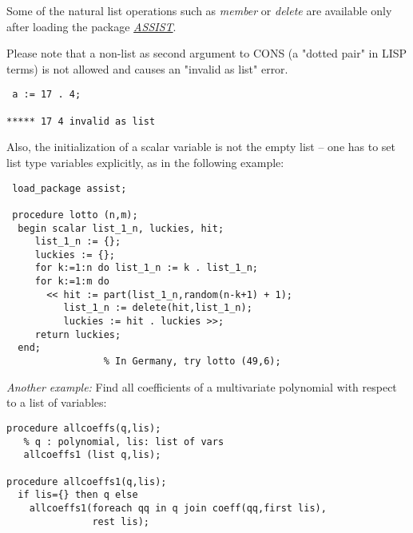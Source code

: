 Some of the natural list operations such as \textit{member} or
\textit{delete} are available only after loading the package
\textit{\hyperlink{ASSIST}{ASSIST}}.

Please note that a non-list as second argument to CONS
(a "dotted pair" in LISP terms) is not allowed
and causes an "invalid as list" error.
\begin{verbatim}
 a := 17 . 4;

***** 17 4 invalid as list
\end{verbatim}
Also, the initialization of a scalar variable is not the empty list --
one has to set list type variables explicitly, as in the following
example:
\begin{verbatim}
 load_package assist;

 procedure lotto (n,m);
  begin scalar list_1_n, luckies, hit;
     list_1_n := {};
     luckies := {};
     for k:=1:n do list_1_n := k . list_1_n;
     for k:=1:m do
       << hit := part(list_1_n,random(n-k+1) + 1);
          list_1_n := delete(hit,list_1_n);
          luckies := hit . luckies >>;
     return luckies;
  end;
                 % In Germany, try lotto (49,6);
\end{verbatim}

\textit{Another example:} Find all coefficients of a multivariate
polynomial with respect to a list of variables:

\begin{verbatim}
procedure allcoeffs(q,lis); 
   % q : polynomial, lis: list of vars
   allcoeffs1 (list q,lis);

procedure allcoeffs1(q,lis);
  if lis={} then q else
    allcoeffs1(foreach qq in q join coeff(qq,first lis),
               rest lis);
\end{verbatim}

